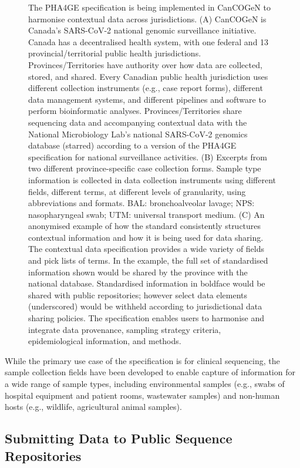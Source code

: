 \begin{figure}[]
\caption{The PHA4GE specification is being implemented in CanCOGeN to harmonise contextual data across jurisdictions. (A) CanCOGeN is Canada's SARS-CoV-2 national genomic surveillance initiative. Canada has a decentralised health system, with one federal and 13 provincial/territorial public health jurisdictions. Provinces/Territories have authority over how data are collected, stored, and shared. Every Canadian public health jurisdiction uses different collection instruments (e.g., case report forms), different data management systems, and different pipelines and software to perform bioinformatic analyses. Provinces/Territories share sequencing data and accompanying contextual data with the National Microbiology Lab's national SARS-CoV-2 genomics database (starred) according to a version of the PHA4GE specification for national surveillance activities. (B) Excerpts from two different province-specific case collection forms. Sample type information is collected in data collection instruments using different fields, different terms, at different levels of granularity, using abbreviations and formats. BAL: bronchoalveolar lavage; NPS: nasopharyngeal swab; UTM: universal transport medium. (C) An anonymised example of how the standard consistently structures contextual information and how it is being used for data sharing. The contextual data specification provides a wide variety of fields and pick lists of terms. In the example, the full set of standardised information shown would be shared by the province with the national database. Standardised information in boldface would be shared with public repositories; however select data elements (underscored) would be withheld according to jurisdictional data sharing policies. The specification enables users to harmonise and integrate data provenance, sampling strategy criteria, epidemiological information, and methods.}
\label{fig:chap7_figure_2}
\end{figure}

While the primary use case of the specification is for clinical sequencing, the sample collection fields have been developed to enable capture of information for a wide range of sample types, including environmental samples (e.g., swabs of hospital equipment and patient rooms, wastewater samples) and non-human hosts (e.g., wildlife, agricultural animal samples).

\subsection{Submitting Data to Public Sequence Repositories }

